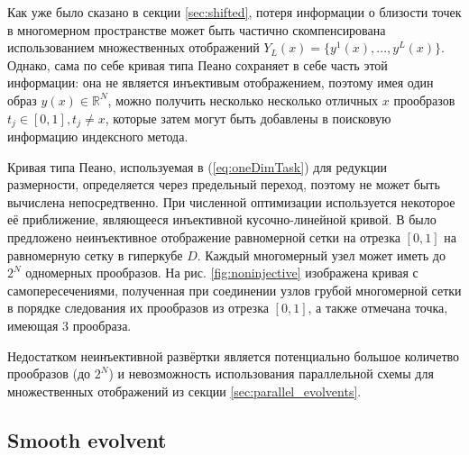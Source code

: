 \documentclass[runningheads]{llncs}
\begin{document}
Как уже было сказано в секции \ref{sec:shifted}, потеря информации о близости точек в многомерном пространстве может быть частично скомпенсирована использованием множественных отображений $Y_L(x)=\{y^1(x),...,y^L(x)\}$. Однако, сама по себе кривая типа Пеано сохраняет в себе часть этой информации: она не является инъективым отображением, поэтому имея один образ $y(x)\in \mathbb{R}^N$, можно получить несколько несколько отличных $x$ прообразов $t_j\in[0,1], t_j \not = x$, которые затем могут быть добавлены в поисковую информацию индексного метода.

Кривая типа Пеано, используемая в (\ref{eq:oneDimTask}) для редукции размерности, определяется через предельный переход,
поэтому не может быть вычислена непосредтвенно. При численной оптимизации используется некоторое её приближение, являющееся
инъективной кусочно-линейной кривой. В \cite{strongin1978} было предложено неинъективное отображение равномерной сетки на отрезка $[0,1]$ на равномерную сетку в гиперкубе $D$. Каждый многомерный узел может иметь до $2^N$ одномерных прообразов. На рис. \ref{fig:noninjective} изображена кривая с самопересечениями, полученная при соединении узлов грубой многомерной сетки в порядке следования их прообразов из отрезка $[0,1]$, а также отмечана точка, имеющая 3 прообраза.

Недостатком неинъективной развёртки является потенциально большое количетво прообразов (до $2^N$) и невозможность использования параллельной схемы для множественных отображений из секции \ref{sec:parallel_evolvents}.

\subsection{Smooth evolvent}
\end{document}
